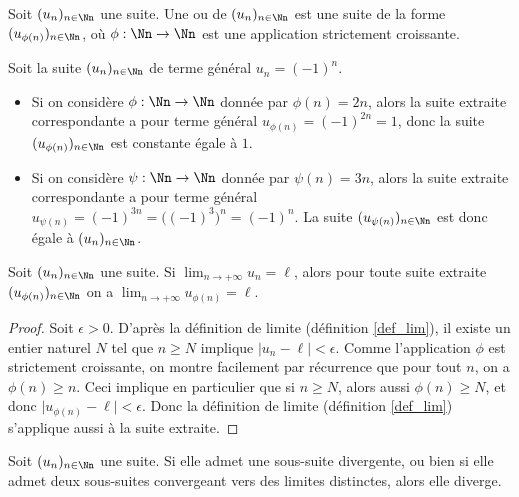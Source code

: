 \documentclass[class=report,crop=false]{standalone}
\begin{document}
\begin{definition}
  Soit $(u_n)_{n\in \Nn}$ une suite. Une  ou
 de  $(u_n)_{n\in \Nn}$ est une suite de la forme
$(u_{\phi(n)})_{n\in \Nn}$, où $\phi : \Nn \to \Nn$ est une application strictement croissante.
\end{definition}




\begin{exemple}
Soit la suite $(u_n)_{n\in \Nn}$ de terme général $u_n=(-1)^n$.
\begin{itemize}
  \item Si on considère $\phi : \Nn \to \Nn$ donnée par $\phi(n)=2n$,
alors la suite extraite correspondante a pour terme général $u_{\phi(n)}=(-1)^{2n}=1$,
donc la suite $(u_{\phi(n)})_{n\in \Nn}$ est constante égale à $1$.
  \item Si on considère $\psi : \Nn \to \Nn$ donnée par $\psi(n)=3n$, alors la suite
extraite correspondante a pour terme général $u_{\psi(n)}=(-1)^{3n}=\big( (-1)^3\big)^n = (-1)^n$.
La suite $(u_{\psi(n)})_{n\in \Nn}$ est donc égale à $(u_n)_{n\in \Nn}$.

\end{itemize}
\end{exemple}

\begin{proposition}
  Soit $(u_n)_{n\in \Nn}$ une suite. Si $\lim_{n\to +\infty}u_n=\ell$, alors
pour toute suite extraite $(u_{\phi(n)})_{n\in \Nn}$ on a $\lim_{n\to +\infty} u_{\phi(n)}=\ell$.
\end{proposition}

\begin{proof}
  Soit $\epsilon >0$. D'après la définition de limite (définition \ref{def_lim}),
il existe un entier naturel $N$ tel que $n\geq N$ implique $\lvert u_n-\ell \rvert <\epsilon$.
Comme l'application $\phi$ est strictement croissante, on montre facilement par récurrence
que pour tout $n$, on a $\phi(n)\geq n$. Ceci implique en particulier que si $n\geq N$,
alors aussi $\phi(n)\geq N$, et donc $\lvert u_{\phi(n)}-\ell \rvert <\epsilon$.
Donc la définition de limite (définition \ref{def_lim}) s'applique aussi à la suite extraite.

\end{proof}

\begin{corollaire}
  Soit $(u_n)_{n\in \Nn}$ une suite. Si elle admet une sous-suite divergente,
ou bien si elle admet deux sous-suites convergeant vers des limites distinctes, alors elle diverge.
\end{corollaire}
\end{document}
